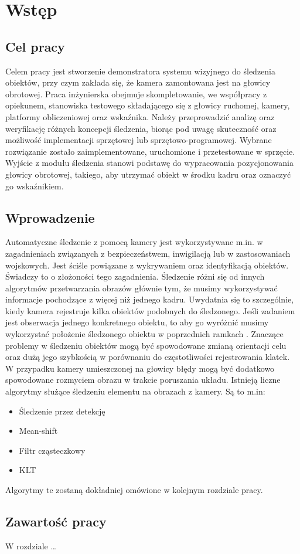 \chapter{Wstęp}
\label{cha:wstep}

\section{Cel pracy}
\label{sec:celpracy}

Celem pracy jest stworzenie demonstratora systemu wizyjnego do śledzenia obiektów, przy czym zakłada się, że kamera zamontowana jest na głowicy obrotowej. Praca inżynierska obejmuje skompletowanie, we współpracy z opiekunem, stanowiska testowego składającego się z głowicy ruchomej, kamery, platformy obliczeniowej oraz wskaźnika. Należy przeprowadzić analizę oraz weryfikację różnych koncepcji śledzenia, biorąc pod uwagę skuteczność oraz możliwość implementacji sprzętowej lub sprzętowo-programowej. Wybrane rozwiązanie zostało zaimplementowane, uruchomione i przetestowane w sprzęcie. Wyjście z modułu śledzenia stanowi podstawę do wypracowania pozycjonowania głowicy obrotowej, takiego, aby utrzymać obiekt w środku kadru oraz oznaczyć go wskaźnikiem.

\section{Wprowadzenie}
\label{sec:wprowadzenie}

Automatyczne śledzenie z pomocą kamery jest wykorzystywane m.in. w zagadnieniach związanych z bezpieczeństwem, inwigilacją lub w zastosowaniach wojskowych. Jest ściśle powiązane z wykrywaniem oraz identyfikacją obiektów. Świadczy to o złożoności tego zagadnienia. Śledzenie różni się od innych algorytmów przetwarzania obrazów głównie tym, że musimy wykorzystywać informacje pochodzące z więcej niż jednego kadru. Uwydatnia się to szczególnie, kiedy kamera rejestruje kilka obiektów podobnych do śledzonego. Jeśli zadaniem jest obserwacja jednego konkretnego obiektu, to aby go wyróżnić musimy wykorzystać położenie śledzonego obiektu w poprzednich ramkach \cite{VT}. Znaczące problemy w śledzeniu obiektów mogą być spowodowane zmianą orientacji celu oraz dużą jego szybkością w porównaniu do częstotliwości rejestrowania klatek. W przypadku kamery umieszczonej na głowicy błędy mogą być dodatkowo spowodowane rozmyciem obrazu w trakcie poruszania układu. Istnieją liczne algorytmy służące śledzeniu elementu na obrazach z kamery. Są to m.in:
\begin{itemize}
\item{Śledzenie przez detekcję}
\item{Mean-shift}
\item{Filtr cząsteczkowy}
\item{KLT}
\end{itemize}
Algorytmy te zostaną dokładniej omówione w kolejnym rozdziale pracy.

\section{Zawartość pracy}
\label{sec:zawartoscpracy}

W rozdziale \dots